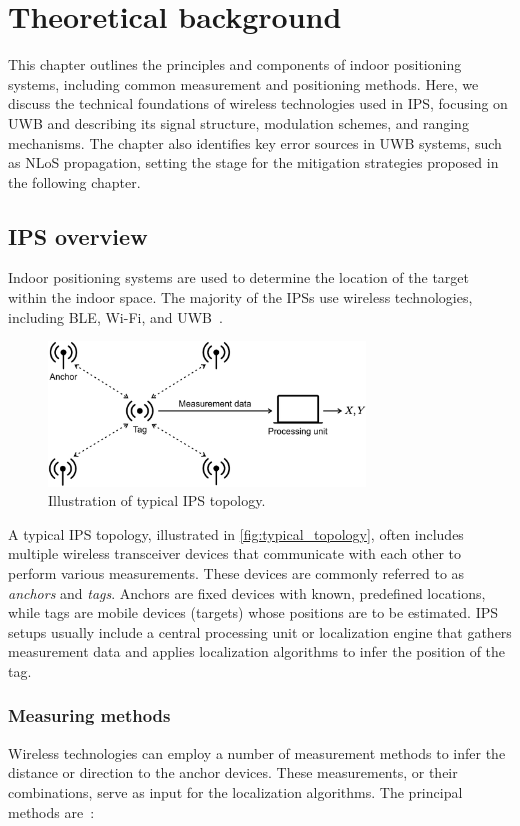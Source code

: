 \chapter{Theoretical background}
This chapter outlines the principles and components of indoor positioning systems, including common measurement and positioning methods. Here, we discuss the technical foundations of wireless technologies used in IPS, focusing on UWB and describing its signal structure, modulation schemes, and ranging mechanisms. The chapter also identifies key error sources in UWB systems, such as NLoS propagation, setting the stage for the mitigation strategies proposed in the following chapter.

\section{IPS overview}
Indoor positioning systems are used to determine the location of the target within the indoor space. The majority of the IPSs use wireless technologies, including BLE, Wi-Fi, and UWB~\cite{singh2024systematic}.

\begin{figure}[tbh]
\includegraphics[width=0.75\textwidth]{Figures/theoretical_background/ips_topology.pdf}
\centering
\caption{Illustration of typical IPS topology.}
\label{fig:typical_topology}
\end{figure}

A typical IPS topology, illustrated in \autoref{fig:typical_topology}, often includes multiple wireless transceiver devices that communicate with each other to perform various measurements. These devices are commonly referred to as \emph{anchors} and \emph{tags}. Anchors are fixed devices with known, predefined locations, while tags are mobile devices (targets) whose positions are to be estimated. IPS setups usually include a central processing unit or localization engine that gathers measurement data and applies localization algorithms to infer the position of the tag.

\subsection{Measuring methods}
Wireless technologies can employ a number of measurement methods to infer the distance or direction to the anchor devices. These measurements, or their combinations, serve as input for the localization algorithms. The principal methods are~\cite{mazhar2017precise}:

